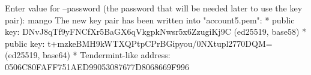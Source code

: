 \begin{shellbox}\begin{ttlst}
Enter value for --password (the password that will be needed later to use the key pair): mango
The new key pair has been written into "account5.pem":
* public key: DNvJ8qTf9yFNCfXr5BaGX6qVkgpkNwsr5x6ZzugiKj9C (ed25519, base58)
* public key: t+mzkeBMH9kWTXQPtpCPrBGipyou/0NXtupl2770DQM= (ed25519, base64)
* Tendermint-like address: 0506C80FAFF751AED99053087677D8068669F996
\end{ttlst}\end{shellbox}
